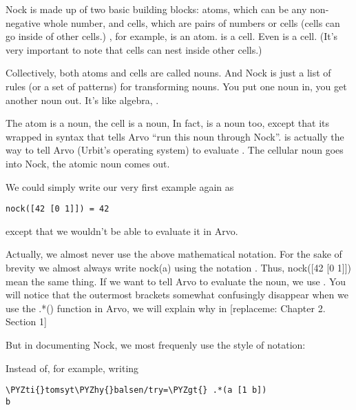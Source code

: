 Nock is made up of two basic building blocks: atoms, which can be any
non-negative whole number, and cells, which are pairs of numbers or cells
(cells can go inside of other cells.) , for example, is an atom. \kode{[0 1]} is
a cell. Even \kode{[42 [0 1]]} is a cell. (It's very important to note that cells
can nest inside other cells.)

Collectively, both atoms and cells are called nouns. And Nock is just a list of
rules (or a set of patterns) for transforming nouns.  You put one noun in, you
get another noun out. It's like algebra, . 

The atom  is a noun, the cell \kode{[0 1]} is a noun, In fact, 
is a noun too, except that its wrapped in syntax that tells Arvo ``run
this noun through Nock''.  is actually the way to tell Arvo
(Urbit's operating system) to evaluate . The cellular noun
\kode{[42 [0 1]]} goes into Nock, the atomic noun  comes out.

We could simply write our very first example again as 

\begin{framed_shaded}
\begin{Verbatim}[fontsize=\relsize{-2.5},fontseries=b,commandchars=\\\{\}]
nock([42 [0 1]]) = 42
\end{Verbatim}
\end{framed_shaded}
except that we wouldn't be able to evaluate it in Arvo.

Actually, we almost never use the above mathematical notation. For the sake of
brevity we almost always write nock(a) using the notation . Thus, nock([42
[0 1]])  \kode{*[42 [0 1]]} mean the same thing. If we want to tell Arvo to evaluate
the noun, we use . You will notice that the outermost brackets
somewhat confusingly disappear when we use the .*() function in Arvo, we will
explain why in [replaceme: Chapter 2. Section 1] 

But in documenting Nock, we most frequenly use the \kode{*[42 [0 1]]} style of
notation:

Instead of, for example, writing

\begin{framed_shaded}
\begin{Verbatim}[fontsize=\relsize{-2.5},fontseries=b,commandchars=\\\{\}]
\PYZti{}tomsyt\PYZhy{}balsen/try=\PYZgt{} .*(a [1 b]) 
b
\end{Verbatim}
\end{framed_shaded}

